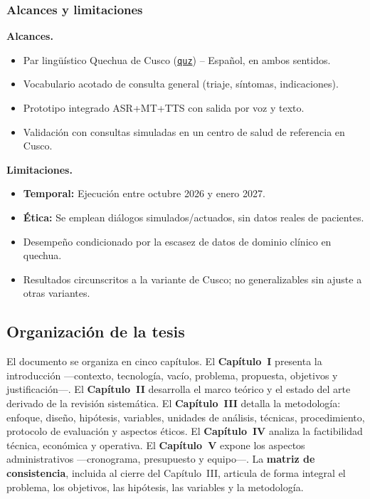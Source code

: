 \documentclass[12pt,a4paper]{article}
\newcommand{\nuevo}[1]{#1}
\newcommand{\obsdos}[1]{\textcolor{verdeOK}{#1}}
\DeclareRobustCommand{\sig}[1]{\hyperlink{sig:#1}{\texttt{#1}}}
\begin{document}
\subsubsection{Alcances y limitaciones}
\noindent\textbf{Alcances.}
\begin{itemize}
  \item Par ling{\"u}{\'i}stico Quechua de Cusco (\sig{quz}) -- Espa{\~n}ol, en ambos sentidos.
  \item Vocabulario acotado de consulta general (triaje, s{\'i}ntomas, indicaciones).
  \item Prototipo integrado ASR+MT+TTS con salida por voz y texto.
  \item Validaci{\'o}n con consultas simuladas en un centro de salud de referencia en Cusco.
\end{itemize}
\noindent\textbf{Limitaciones.}
\begin{itemize}
  \item \textbf{Temporal:} Ejecuci{\'o}n entre octubre 2026 y enero 2027.
  \item \textbf{{\'E}tica:} Se emplean di{\'a}logos simulados/actuados, sin datos reales de pacientes.
  \item Desempe{\~n}o condicionado por la escasez de datos de dominio cl{\'i}nico en quechua.
  \item Resultados circunscritos a la variante de Cusco; no generalizables sin ajuste a otras variantes.
\end{itemize}

\subsection{Organizaci{\'o}n de la tesis}
El documento se organiza en cinco cap{\'i}tulos. El \textbf{Cap{\'i}tulo~I} presenta la
introducci{\'o}n ---contexto, tecnolog{\'i}a, vac{\'i}o, problema, propuesta, objetivos
y justificaci{\'o}n---. El \textbf{Cap{\'i}tulo~II} desarrolla el marco te{\'o}rico y el estado del
arte derivado de la revisi{\'o}n sistem{\'a}tica. El \textbf{Cap{\'i}tulo~III} detalla la
metodolog{\'i}a: enfoque, dise{\~n}o, \obsdos{hip{\'o}tesis}, variables, unidades de an{\'a}lisis,
t{\'e}cnicas, procedimiento, protocolo de evaluaci{\'o}n y aspectos {\'e}ticos. El \textbf{Cap{\'i}tulo~IV}
analiza la factibilidad t{\'e}cnica, econ{\'o}mica y operativa. El \textbf{Cap{\'i}tulo~V} expone los
aspectos administrativos ---cronograma, presupuesto y equipo---. \nuevo{La \textbf{matriz de
consistencia}, incluida al cierre del Cap{\'i}tulo~III, articula de forma integral el problema, los
objetivos, las hip{\'o}tesis, las variables y la metodolog{\'i}a.}
\end{document}
